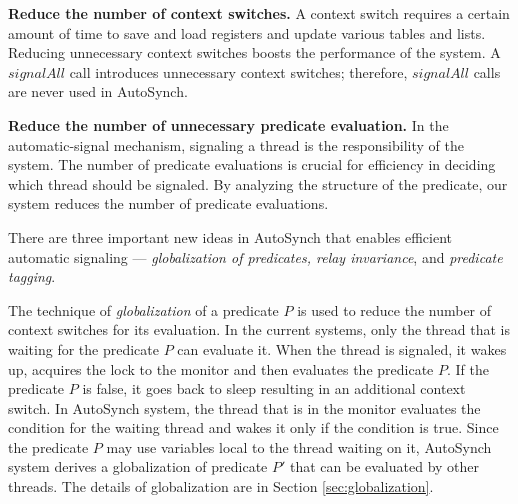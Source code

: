 \documentclass[preprint]{sigplanconf}
\begin{document}
\begin{description}
    \item{\bf Reduce the number of context switches.} A context switch requires a certain 
        amount of time to save and load registers and update various tables and
        lists. Reducing unnecessary context switches boosts the performance of the system.
        A $signalAll$ call introduces unnecessary context switches; therefore,
        $signalAll$ calls are never used in AutoSynch. 
    \item {\bf Reduce the number of unnecessary predicate evaluation.} In the 
        automatic-signal mechanism, signaling a thread is the 
        responsibility of the system. The number of predicate evaluations is 
        crucial for efficiency in deciding which thread should be signaled. 
        By analyzing the structure of the predicate, our system reduces the number of predicate evaluations.
\end{description}


There are three important new ideas in AutoSynch that enables efficient automatic
signaling --- {\em globalization of predicates, relay invariance}, and {\em predicate
tagging}.

The technique of {\em globalization} of a predicate $P$ is used to reduce the number of 
context switches for its evaluation. In the current systems, only the thread that is waiting
for the predicate $P$ can evaluate it. When the thread is signaled, it wakes up, acquires the
lock to the monitor and then evaluates the predicate $P$. If the predicate $P$ is false, it
goes back to sleep resulting in an additional context switch. In AutoSynch system, the thread
that is in the monitor evaluates the condition for the waiting thread and wakes it only
if the condition is true. Since the predicate $P$ may use variables local to the thread
waiting on it, AutoSynch system derives a globalization of predicate $P'$ that
can be evaluated by other threads. The details of globalization are in Section \ref{sec:globalization}.

\end{document}
